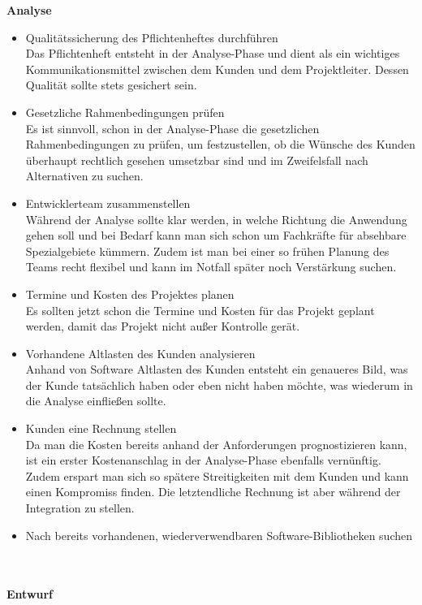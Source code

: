 \documentclass[a4paper,graphics,11pt]{article}
\begin{document}
\textbf{Analyse}
\begin{itemize}
\item Qualitätssicherung des Pflichtenheftes durchführen\\
Das Pflichtenheft entsteht in der Analyse-Phase und dient als ein wichtiges Kommunikationsmittel zwischen dem Kunden und dem Projektleiter. Dessen Qualität sollte
stets gesichert sein.
\item Gesetzliche Rahmenbedingungen prüfen\\
Es ist sinnvoll, schon in der Analyse-Phase die gesetzlichen Rahmenbedingungen zu prüfen, um festzustellen, ob die Wünsche des Kunden überhaupt rechtlich gesehen
umsetzbar sind und im Zweifelsfall nach Alternativen zu suchen.
\item Entwicklerteam zusammenstellen \\
Während der Analyse sollte klar werden, in welche Richtung die Anwendung gehen soll und bei Bedarf kann man sich schon um Fachkräfte für absehbare Spezialgebiete
kümmern. Zudem ist man bei einer so frühen Planung des Teams recht flexibel und kann im Notfall später noch Verstärkung suchen.
\item Termine und Kosten des Projektes planen \\
Es sollten jetzt schon die Termine und Kosten für das Projekt geplant werden, damit das Projekt nicht außer Kontrolle gerät. 
\item Vorhandene Altlasten des Kunden analysieren \\
Anhand von Software Altlasten des Kunden entsteht ein genaueres Bild, was der Kunde tatsächlich haben oder eben nicht haben möchte, was wiederum in die Analyse
einfließen sollte.
\item Kunden eine Rechnung stellen \\
Da man die Kosten bereits anhand der Anforderungen prognostizieren kann, ist ein erster Kostenanschlag in der Analyse-Phase ebenfalls vernünftig. Zudem erspart man sich
so spätere Streitigkeiten mit dem Kunden und kann einen Kompromiss finden. Die letztendliche Rechnung ist aber während der Integration zu stellen.
\item Nach bereits vorhandenen, wiederverwendbaren Software-Bibliotheken suchen\\
\end{itemize} \ \\ \ \\
\textbf{Entwurf}
\end{document}
